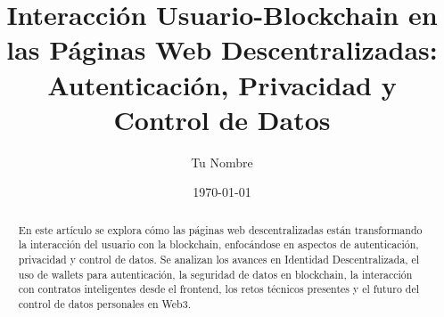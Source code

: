 \documentclass[10pt,twocolumn]{article}
\title{Interacción Usuario-Blockchain en las Páginas Web Descentralizadas: Autenticación, Privacidad y Control de Datos}
\author{Tu Nombre}
\date{\today}
\begin{document}
\maketitle

\begin{abstract}
En este artículo se explora cómo las páginas web descentralizadas están transformando la interacción del usuario con la blockchain, enfocándose en aspectos de autenticación, privacidad y control de datos. Se analizan los avances en Identidad Descentralizada, el uso de wallets para autenticación, la seguridad de datos en blockchain, la interacción con contratos inteligentes desde el frontend, los retos técnicos presentes y el futuro del control de datos personales en Web3.
\end{abstract}












\end{document}
